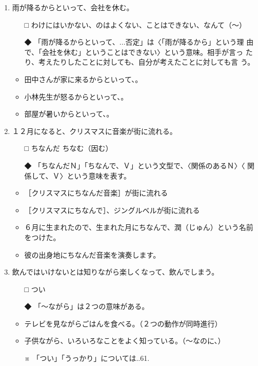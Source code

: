 \documentclass[
uplatex,
b5paper,
10pt,
dvipdfmx
]{jsbook}
\begin{document}
\begin{enumerate}
\item 雨が降るからといって、会社を休む\underline{\hspace{3zw}}。
\begin{itemize}
\item[□] わけにはいかない、のはよくない、ことはできない、なんて（〜）
\item[◆] 「雨が降るからといって、...否定」は〈「雨が降るから」という理
	  由で、「会社を休む」ということはできない〉という意味。相手が言っ
	  たり、考えたりしたことに対しても、自分が考えたことに対しても言
	  う。
\end{itemize}
\begin{itemize}
 \item 田中さんが家に来るからといって、\underline{\hspace{3zw}}。
 \item 小林先生が怒るからといって、\underline{\hspace{3zw}}。
 \item 部屋が暑いからといって、\underline{\hspace{3zw}}。
\end{itemize}

\item １２月になると、クリスマスに\underline{\hspace{3zw}}音楽が街に流れる。
\begin{itemize}
\item[□] ちなんだ  ちなむ（因む）
\item[◆] 「ちなんだＮ」「ちなんで、Ｖ」という文型で、〈関係のあるＮ〉〈
	  関係して、Ｖ〉という意味を表す。
\item ［クリスマスにちなんだ音楽］が街に流れる
\item ［クリスマスにちなんで］、ジングルベルが街に流れる
\end{itemize}
\begin{itemize}
\item ６月に生まれたので、生まれた月にちなんで、潤（じゅん）という名前
       をつけた。
\item 彼の出身地にちなんだ音楽を演奏します。 
\end{itemize}

\item 飲んではいけないとは知りながら楽しくなって、\underline{\hspace{3zw}}飲んでしまう。
\begin{itemize}
\item[□] つい
\item[◆] 「〜ながら」は２つの意味がある。
\item テレビを見ながらごはんを食べる。（２つの動作が同時進行）
\item 子供ながら、いろいろなことをよく知っている。（〜なのに、）
\item[※] 「つい」「うっかり」については..61.
\end{itemize}
\end{enumerate}
\end{document}
